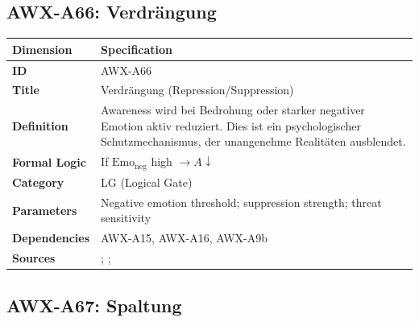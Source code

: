 
\subsection{AWX-A66: Verdrängung}

\begin{table}[htbp]
\small
\begin{tabular}{p{3cm}p{11cm}}
\toprule
\textbf{Dimension} & \textbf{Specification} \\
\midrule
\textbf{ID} & AWX-A66 \\
\textbf{Title} & Verdrängung (Repression/Suppression) \\
\textbf{Definition} & Awareness wird bei Bedrohung oder starker negativer Emotion aktiv reduziert. Dies ist ein psychologischer Schutzmechanismus, der unangenehme Realitäten ausblendet. \\
\textbf{Formal Logic} & If $\text{Emo}_{\text{neg}}$ high $\rightarrow A \downarrow$ \\
\textbf{Category} & LG (Logical Gate) \\
\textbf{Parameters} & Negative emotion threshold; suppression strength; threat sensitivity \\
\textbf{Dependencies} & AWX-A15, AWX-A16, AWX-A9b \\
\textbf{Sources} & \citet{freud1915repression}; \citet{baumeister1998ego}; \citet{gross2002emotion} \\
\bottomrule
\end{tabular}
\end{table}


\subsection{AWX-A67: Spaltung}

